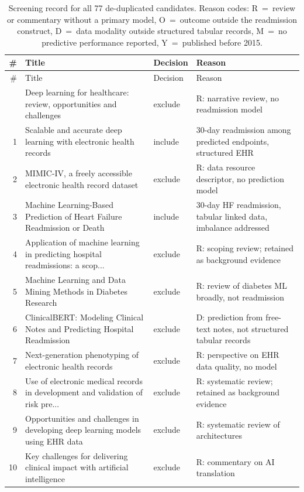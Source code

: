 \setlength{\tabcolsep}{4pt}
\begin{longtable}{rp{4.9cm}p{1.35cm}p{4.6cm}}
\caption{Screening record for all 77 de-duplicated candidates. Reason codes: R~=~review or commentary without a primary model, O~=~outcome outside the readmission construct, D~=~data modality outside structured tabular records, M~=~no predictive performance reported, Y~=~published before 2015.}\label{tab:screening}\\
\toprule \# & Title & Decision & Reason \\ \midrule
\endfirsthead
\toprule \# & Title & Decision & Reason \\ \midrule
\endhead
\bottomrule
\endfoot
0 & Deep learning for healthcare: review, opportunities and challenges & exclude & R: narrative review, no readmission model \\
1 & Scalable and accurate deep learning with electronic health records & include & 30-day readmission among predicted endpoints, structured EHR \\
2 & MIMIC-IV, a freely accessible electronic health record dataset & exclude & R: data resource descriptor, no prediction model \\
3 & Machine Learning-Based Prediction of Heart Failure Readmission or Death & include & 30-day HF readmission, tabular linked data, imbalance addressed \\
4 & Application of machine learning in predicting hospital readmissions: a scop... & exclude & R: scoping review; retained as background evidence \\
5 & Machine Learning and Data Mining Methods in Diabetes Research & exclude & R: review of diabetes ML broadly, not readmission \\
6 & ClinicalBERT: Modeling Clinical Notes and Predicting Hospital Readmission & exclude & D: prediction from free-text notes, not structured tabular records \\
7 & Next-generation phenotyping of electronic health records & exclude & R: perspective on EHR data quality, no model \\
8 & Use of electronic medical records in development and validation of risk pre... & exclude & R: systematic review; retained as background evidence \\
9 & Opportunities and challenges in developing deep learning models using EHR data & exclude & R: systematic review of architectures \\
10 & Key challenges for delivering clinical impact with artificial intelligence & exclude & R: commentary on AI translation \\

\end{longtable}
